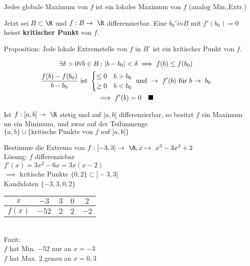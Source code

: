 \begin{fakt}
	Jedes globale Maximum von $f$ ist ein lokales Maximum von $f$ (analog Min.,Extr.)
\end{fakt}
\begin{def*}[note = kritischer Punkt , index = kritischer Punkt]
	Jetzt sei $B \subset \R$ und $f: B \rightarrow \R$ differenzierbar.
	Eine $b_0 'in B$ mit $f'(b_0) = 0$ heisst \textbf{kritischer Punkt} von $f$.
\end{def*}
Proposition: Jede lokale Extremstelle von $f$ in $B^\circ$ ist ein kritischer Punkt von $f$.\\
\begin{bew}
	\begin{gather*}
		\exists \delta > 0 \forall b \in B : \abs{b-b_0} < \delta \implies f(b) \leq f(b_0) \\
		\frac{f(b)-f(b_0)}{b-b_0} \text{ ist } \begin{cases}
			\leq 0	&b > b_0	\\
			\geq 0	&b < b_0	
		\end{cases} \text{ und } \rightarrow f'(b) \text{ für } b \rightarrow b_0 \\
		\implies f'(b) = 0 \quad \blacksquare
	\end{gather*}
\end{bew}
\begin{folge}
	Ist $f: [a,b] \rightarrow \R$ stetig und auf $]a,b[$ differenzierbar, so besitzt $f$ ein Maximum un ein Minimum, und zwar auf der Teilunmenge \\
$\{ a,b \} \cup \{ \text{kritische Punkte von $f$ auf } ]a,b[ \}$
\end{folge}
\begin{bsp}
	Bestimme die Extrema von $f: [-3,3] \rightarrow \R, x \mapsto x^3 - 3x^2 + 2$\\
	Lösung: $f$ differenziebar \\
	$f'(x) = 3x^2 - 6x = 3x(x-2)$\\
	$\implies$ kritische Punkte $\{ 0 , 2 \} \subset ]-3,3[$ \\
	Kandidaten $\{ -3,3,0,2 \}$\\
	\begin{tabular}{ | c | c | c | c | c | }
		\hline
		$x$		&$-3$	&$3$	&$0$	&$2$		\\ \hline
		$f(x)$	&$-52$	&$2$	&$2$	&$-2$	\\ \hline
	\end{tabular} \\
	Fazit: \\
	$f$ hat Min. $-52$ nur an $x=-3$ \\
	$f$ hat Max. $2$ genau an $x=0,3$
\end{bsp}
